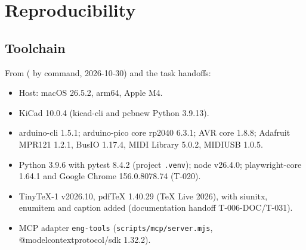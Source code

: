 \section{Reproducibility}
\label{sec:repro}

\subsection{Toolchain}
From  ( by command, 2026-10-30) and
the task handoffs:
\begin{itemize}[noitemsep]
  \item Host: macOS 26.5.2, arm64, Apple M4.
  \item KiCad 10.0.4 (kicad-cli and pcbnew Python 3.9.13).
  \item arduino-cli 1.5.1; arduino-pico core rp2040 6.3.1; AVR core 1.8.8;
        Adafruit MPR121 1.2.1, BusIO 1.17.4, MIDI Library 5.0.2, MIDIUSB 1.0.5.
  \item Python 3.9.6 with pytest 8.4.2 (project \texttt{.venv}); node v26.4.0;
        playwright-core 1.64.1 and Google Chrome 156.0.8078.74 (T-020).
  \item TinyTeX-1 v2026.10, pdfTeX 1.40.29 (TeX Live 2026), with siunitx, enumitem
        and caption added (documentation handoff T-006-DOC/T-031).
  \item MCP adapter \texttt{eng-tools} (\nolinkurl{scripts/mcp/server.mjs},
        @modelcontextprotocol/sdk 1.32.2).
\end{itemize}

